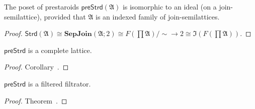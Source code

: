 \begin{cor}
  The poset of prestaroids
  $\mathsf{preStrd} (\mathfrak{A})$ is isomorphic to an ideal
  (on a join-semilattice), provided that $\mathfrak{A}$ is an indexed family
  of join-semilattices.
\end{cor}

\begin{proof}
  $\mathsf{Strd} (\mathfrak{A}) \cong \mathbf{SepJoin} (\mathfrak{A}; 2)
  \cong F \left( \prod \mathfrak{A} \right) / \sim \rightarrow 2 \cong
  \mathfrak{I} \left( F \left( \prod \mathfrak{A} \right) \right)$.
\end{proof}


\begin{cor}
$\mathsf{preStrd}$ is a complete lattice.
\end{cor}

\begin{proof}
Corollary~.
\end{proof}

\begin{cor}
$\mathsf{preStrd}$ is a filtered filtrator.
\end{cor}

\begin{proof}
Theorem~.
\end{proof}

